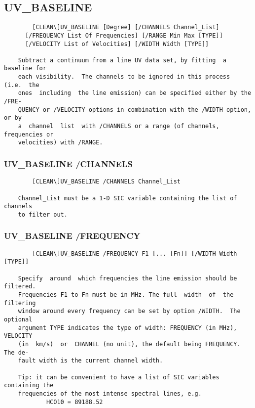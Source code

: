 \subsection{UV\_BASELINE}
\begin{verbatim}
        [CLEAN\]UV_BASELINE [Degree] [/CHANNELS Channel_List]
      [/FREQUENCY List Of Frequencies] [/RANGE Min Max [TYPE]]
      [/VELOCITY List of Velocities] [/WIDTH Width [TYPE]]

    Subtract a continuum from a line UV data set, by fitting  a baseline for
    each visibility.  The channels to be ignored in this process  (i.e.  the
    ones  including  the line emission) can be specified either by the /FRE-
    QUENCY or /VELOCITY options in combination with the /WIDTH option, or by
    a  channel  list  with /CHANNELS or a range (of channels, frequencies or
    velocities) with /RANGE.

\end{verbatim}
\subsubsection{UV\_BASELINE /CHANNELS}
\begin{verbatim}
        [CLEAN\]UV_BASELINE /CHANNELS Channel_List

    Channel_List must be a 1-D SIC variable containing the list of  channels
    to filter out.

\end{verbatim}
\subsubsection{UV\_BASELINE /FREQUENCY}
\begin{verbatim}
        [CLEAN\]UV_BASELINE /FREQUENCY F1 [... [Fn]] [/WIDTH Width [TYPE]]

    Specify  around  which frequencies the line emission should be filtered.
    Frequencies F1 to Fn must be in MHz. The full  width  of  the  filtering
    window around every frequency can be set by option /WIDTH.  The optional
    argument TYPE indicates the type of width: FREQUENCY (in MHz),  VELOCITY
    (in  km/s)  or  CHANNEL (no unit), the default being FREQUENCY.  The de-
    fault width is the current channel width.

    Tip: it can be convenient to have a list of SIC variables containing the
    frequencies of the most intense spectral lines, e.g.
            HCO10 = 89188.52

\end{verbatim}
